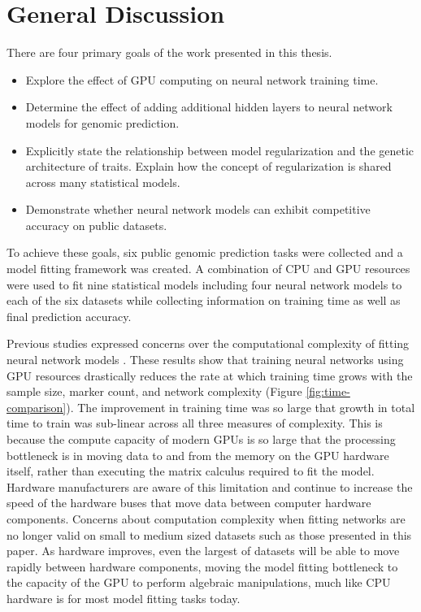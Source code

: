\section{General Discussion}

There are four primary goals of the work presented in this thesis.

\begin{itemize}
    \item Explore the effect of GPU computing on neural network training time.
    \item Determine the effect of adding additional hidden layers to neural 
          network models for genomic prediction.
    \item Explicitly state the relationship between model regularization and 
          the genetic architecture of traits. Explain how the concept of 
          regularization is shared across many statistical models.
    \item Demonstrate whether neural network models can exhibit competitive 
          accuracy on public datasets.
\end{itemize}

To achieve these goals, six public genomic prediction tasks were collected and a
model fitting framework was created. A combination of CPU and GPU resources were
used to fit nine statistical models including four neural network models
to each of the six datasets while collecting information on training 
time as well as final prediction accuracy. 

Previous studies expressed concerns over the computational complexity of fitting
neural network models \citep{heslot2012,gonzalez-recio2014}. These results show
that training neural networks using GPU resources drastically
reduces the rate at which training time grows with the sample size, marker count,
and network complexity (Figure \ref{fig:time-comparison}). The improvement in 
training time was so large that growth in total time to train was sub-linear
across all three measures of complexity. This is because the compute capacity 
of modern GPUs is so large that the processing bottleneck is in moving data 
to and from the memory on the GPU hardware itself, rather than executing 
the matrix calculus required to fit the model. Hardware manufacturers are 
aware of this limitation and continue to increase the speed of the hardware 
buses that move data between computer hardware components. Concerns about 
computation complexity when fitting networks are no longer valid on small 
to medium sized datasets such as those presented in this paper. As hardware
improves, even the largest of datasets will be able to move rapidly between 
hardware components, moving the model fitting bottleneck to the capacity of the
GPU to perform algebraic manipulations, much like CPU hardware is for most 
model fitting tasks today.

